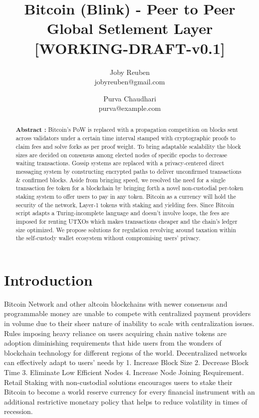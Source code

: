 \documentclass[a4paper,10pt]{article}
\title{
 \Large \textbf{Bitcoin (Blink) - Peer to Peer Global Setlement Layer}\\
\vspace{6mm}
\scriptsize [WORKING-DRAFT-v0.1]
}
\author{ \myfontt Joby Reuben \\ \myfontt jobyreuben@gmail.com \and  \myfontt Purva Chaudhari \\ \myfontt purva@example.com}
\date{}
\begin{document}
\maketitle
\begin{abstract}
\noindent \textbf{Abstract :} Bitcoin's PoW is replaced with a propagation competition on blocks sent across validators under a certain time interval stamped with cryptographic proofs to claim fees and solve forks as per proof weight. To bring adaptable scalability the block sizes are decided on consensus among elected nodes of specific epochs to decrease waiting transactions. Gossip systems are replaced with a privacy-centered direct messaging system by constructing encrypted paths to deliver unconfirmed transactions \& confirmed blocks. Aside from bringing speed, we resolved the need for a single transaction fee token for a blockchain by bringing forth a novel non-custodial per-token staking system to offer users to pay in any token. Bitcoin as a currency will hold the security of the network, Layer-1 tokens with staking and yielding fees. Since Bitcoin script adapts a Turing-incomplete language and doesn't involve loops, the fees are imposed for renting UTXOs which makes transactions cheaper and the chain's ledger size optimized. We propose solutions for regulation revolving around taxation within the self-custody wallet ecosystem without compromising users' privacy. 

\end{abstract}

\section{Introduction}
Bitcoin Network and other altcoin blockchains with newer consensus and programmable money are unable to compete with centralized payment providers in volume due to their sheer nature of inability to scale with centralization issues. Rules imposing heavy reliance on users acquiring chain native tokens are adoption diminishing requirements that hide users from the wonders of blockchain technology for different regions of the world. Decentralized networks can effectively adapt to users' needs by 1. Increase Block Size 2. Decrease Block Time 3. Eliminate Low Efficient Nodes 4. Increase Node Joining Requirement. Retail Staking with non-custodial solutions encourages users to stake their Bitcoin to become a world reserve currency for every financial instrument with an additional restrictive monetary policy that helps to reduce volatility in times of recession.
\end{document}
